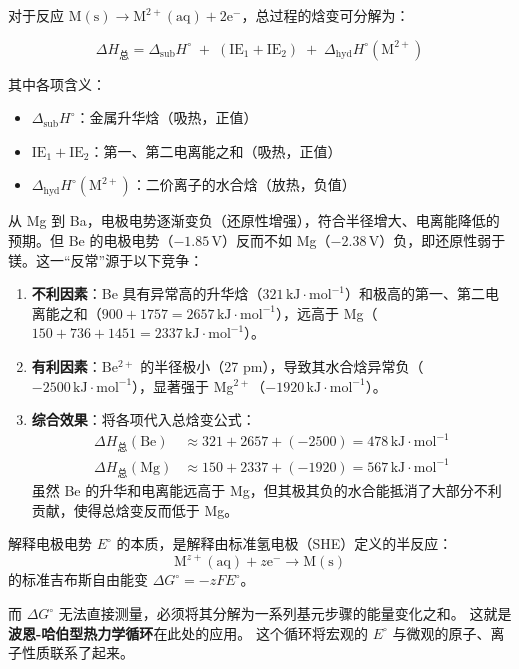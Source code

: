 \documentclass[UTF8]{ctexbook}
\begin{document}
对于反应 \(\mathrm{M(s) \rightarrow M^{2+}(aq) + 2e^-}\)，总过程的焓变可分解为：

\[
\Delta H_{\text{总}} = \Delta_{\mathrm{sub}}H^{\circ} \;+\; (\mathrm{IE_1 + IE_2}) \;+\; \Delta_{\mathrm{hyd}}H^{\circ}(\mathrm{M^{2+}})
\]

其中各项含义：
\begin{itemize}
    \item \(\Delta_{\mathrm{sub}}H^{\circ}\)：金属升华焓（吸热，正值）
    \item \(\mathrm{IE_1 + IE_2}\)：第一、第二电离能之和（吸热，正值）
    \item \(\Delta_{\mathrm{hyd}}H^{\circ}(\mathrm{M^{2+}})\)：二价离子的水合焓（放热，负值）
\end{itemize}


从 Mg 到 Ba，电极电势逐渐变负（还原性增强），符合半径增大、电离能降低的预期。但 Be 的电极电势（\(-1.85\,\mathrm{V}\)）反而不如 Mg（\(-2.38\,\mathrm{V}\)）负，即还原性弱于镁。这一“反常”源于以下竞争：

\begin{enumerate}
    \item \textbf{不利因素}：Be 具有异常高的升华焓（\(321\,\mathrm{kJ\cdot mol^{-1}}\)）和极高的第一、第二电离能之和（\(900+1757=2657\,\mathrm{kJ\cdot mol^{-1}}\)），远高于 Mg（\(150+736+1451=2337\,\mathrm{kJ\cdot mol^{-1}}\)）。
    \item \textbf{有利因素}：Be\(^{2+}\) 的半径极小（27 pm），导致其水合焓异常负（\(-2500\,\mathrm{kJ\cdot mol^{-1}}\)），显著强于 Mg\(^{2+}\)（\(-1920\,\mathrm{kJ\cdot mol^{-1}}\)）。
    \item \textbf{综合效果}：将各项代入总焓变公式：
    \[
    \begin{aligned}
    \Delta H_{\text{总}}(\text{Be}) &\approx 321 + 2657 + (-2500) = 478\,\mathrm{kJ\cdot mol^{-1}} \\
    \Delta H_{\text{总}}(\text{Mg}) &\approx 150 + 2337 + (-1920) = 567\,\mathrm{kJ\cdot mol^{-1}}
    \end{aligned}
    \]
    虽然 Be 的升华和电离能远高于 Mg，但其极其负的水合能抵消了大部分不利贡献，使得总焓变反而低于 Mg。
\end{enumerate}

解释电极电势 $E^\circ$ 的本质，是解释由标准氢电极（SHE）定义的半反应：
\[
\mathrm{M}^{z+}(\mathrm{aq}) + z\mathrm{e}^{-} \rightarrow \mathrm{M}(\mathrm{s})
\]
的标准吉布斯自由能变 $\Delta G^\circ = -zF E^\circ$。

而 $\Delta G^\circ$ 无法直接测量，必须将其分解为一系列基元步骤的能量变化之和。
这就是\textbf{波恩-哈伯型热力学循环}在此处的应用。
这个循环将宏观的 $E^\circ$ 与微观的原子、离子性质联系了起来。
\end{document}
